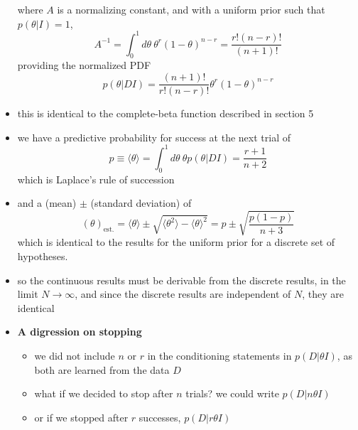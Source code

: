 \documentclass[../jaynes_prob_theory_notes.tex]{subfiles}
\begin{document}
\begin{itemize}
            where $A$ is a normalizing constant, and with a uniform prior such that $p(\theta|I) = 1$, 
                \begin{equation*}
                    A^{-1} = \int^{1}_{0} d{\theta}~{\theta}^r{(1-\theta)}^{n-r} = \frac{r!(n-r)!}{(n+1)!}
                \end{equation*}
            providing the normalized PDF
                \begin{equation}
                    \label{binom_cont_nom_pdf}
                    p(\theta|DI) = \frac{(n+1)!}{r!(n-r)!}{\theta}^r{(1-\theta)}^{n-r}
                \end{equation}
            \item this is identical to the complete-beta function described in section 5
            \item we have a predictive probability for success at the next trial of
                \begin{equation*}
                    p \equiv \langle \theta \rangle = \int^{1}_{0} d{\theta}~{\theta}p(\theta|DI) = \frac{r+1}{n+2}
                \end{equation*}
            which is Laplace's rule of succession
            \item and a (mean) $\pm$ (standard deviation) of 
                \begin{equation*}
                    {(\theta)}_{\mathrm{est.}} = \langle \theta \rangle \pm \sqrt{\langle {\theta}^2 \rangle - {\langle \theta \rangle}^2} = p \pm \sqrt{\frac{p(1-p)}{n+3}}
                \end{equation*}
            which is identical to the results for the uniform prior for a discrete set of hypotheses.\
            \item so the continuous results must be derivable from the discrete results, in the limit $N \rightarrow \infty$, and since the discrete results are independent of $N$, they are identical
            \item \textbf{A digression on stopping}
                \begin{itemize}
                    \item we did not include $n$ or $r$ in the conditioning statements in $p(D|{\theta}I)$, as both are learned from the data $D$
                    \item what if we decided to stop after $n$ trials? we could write $p(D|n{\theta}I)$
                    \item or if we stopped after $r$ successes, $p(D|r{\theta}I)$

\end{itemize}
\end{itemize}
\end{document}
